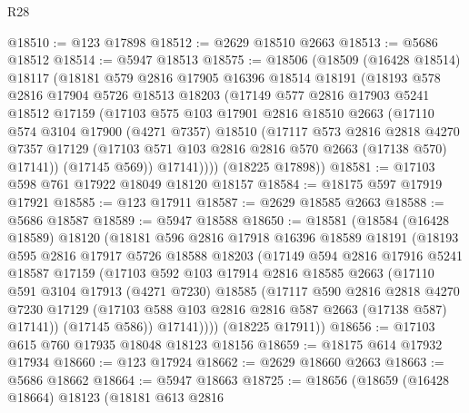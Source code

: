 \begin{lexlean}{R28}
\begin{coremodule}
@18510 := @123 @17898
@18512 := @2629 @18510 @2663
@18513 := @5686 @18512
@18514 := @5947 @18513
@18575 := @18506
    (@18509
      (@16428 @18514)
      @18117
      (@18181
        @579
        @2816
        @17905
        @16396
        @18514
        @18191
        (@18193
          @578
          @2816
          @17904
          @5726
          @18513
          @18203
          (@17149
            @577
            @2816
            @17903
            @5241
            @18512
            @17159
            (@17103
              @575
              @103
              @17901
              @2816
              @18510
              @2663
              (@17110
                @574
                @3104
                @17900
                (@4271 @7357)
                @18510
                (@17117
                  @573
                  @2816
                  @2818
                  @4270
                  @7357
                  @17129
                  (@17103 @571 @103 @2816 @2816 @570 @2663 (@17138 @570) @17141))
                (@17145 @569))
              @17141))))
      (@18225 @17898))
@18581 := @17103 @598 @761 @17922 @18049 @18120 @18157
@18584 := @18175 @597 @17919 @17921
@18585 := @123 @17911
@18587 := @2629 @18585 @2663
@18588 := @5686 @18587
@18589 := @5947 @18588
@18650 := @18581
    (@18584
      (@16428 @18589)
      @18120
      (@18181
        @596
        @2816
        @17918
        @16396
        @18589
        @18191
        (@18193
          @595
          @2816
          @17917
          @5726
          @18588
          @18203
          (@17149
            @594
            @2816
            @17916
            @5241
            @18587
            @17159
            (@17103
              @592
              @103
              @17914
              @2816
              @18585
              @2663
              (@17110
                @591
                @3104
                @17913
                (@4271 @7230)
                @18585
                (@17117
                  @590
                  @2816
                  @2818
                  @4270
                  @7230
                  @17129
                  (@17103 @588 @103 @2816 @2816 @587 @2663 (@17138 @587) @17141))
                (@17145 @586))
              @17141))))
      (@18225 @17911))
@18656 := @17103 @615 @760 @17935 @18048 @18123 @18156
@18659 := @18175 @614 @17932 @17934
@18660 := @123 @17924
@18662 := @2629 @18660 @2663
@18663 := @5686 @18662
@18664 := @5947 @18663
@18725 := @18656
    (@18659
      (@16428 @18664)
      @18123
      (@18181
        @613
        @2816

\end{coremodule}
\end{lexlean}
